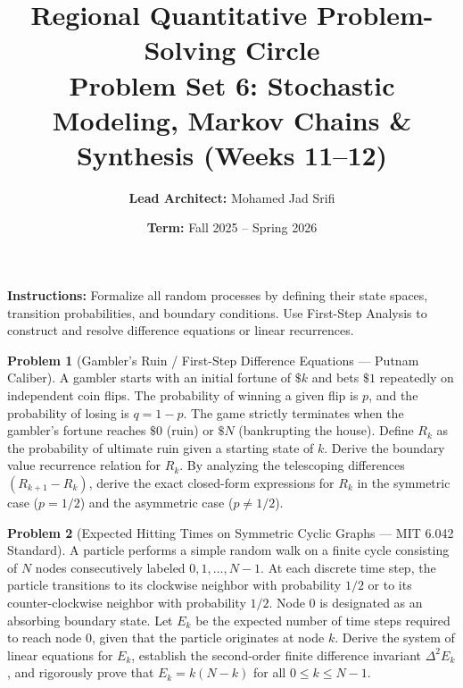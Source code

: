 \documentclass[11pt, a4paper]{article}
\theoremstyle{definition}
\newtheorem{problem}{Problem}
\theoremstyle{plain}
\begin{document}
\title{\vspace{-1.5cm}\textbf{Regional Quantitative Problem-Solving Circle} \\ \Large Problem Set 6: Stochastic Modeling, Markov Chains \& Synthesis (Weeks 11--12)}
\author{\textbf{Lead Architect:} Mohamed Jad Srifi}
\date{\textbf{Term:} Fall 2025 -- Spring 2026}
\maketitle

\noindent\textbf{Instructions:} Formalize all random processes by defining their state spaces, transition probabilities, and boundary conditions. Use First-Step Analysis to construct and resolve difference equations or linear recurrences.

\vspace{0.5cm}

\begin{problem}[Gambler's Ruin / First-Step Difference Equations --- Putnam Caliber]
A gambler starts with an initial fortune of $\$k$ and bets $\$1$ repeatedly on independent coin flips. The probability of winning a given flip is $p$, and the probability of losing is $q = 1 - p$. The game strictly terminates when the gambler's fortune reaches $\$0$ (ruin) or $\$N$ (bankrupting the house).
Define $R_k$ as the probability of ultimate ruin given a starting state of $k$.
Derive the boundary value recurrence relation for $R_k$. By analyzing the telescoping differences $(R_{k+1} - R_k)$, derive the exact closed-form expressions for $R_k$ in the symmetric case ($p = 1/2$) and the asymmetric case ($p \ne 1/2$).
\end{problem}

\vspace{0.5cm}

\begin{problem}[Expected Hitting Times on Symmetric Cyclic Graphs --- MIT 6.042 Standard]
A particle performs a simple random walk on a finite cycle consisting of $N$ nodes consecutively labeled $0, 1, \dots, N-1$. At each discrete time step, the particle transitions to its clockwise neighbor with probability $1/2$ or to its counter-clockwise neighbor with probability $1/2$. Node $0$ is designated as an absorbing boundary state.
Let $E_k$ be the expected number of time steps required to reach node $0$, given that the particle originates at node $k$.
Derive the system of linear equations for $E_k$, establish the second-order finite difference invariant $\Delta^2 E_k$, and rigorously prove that $E_k = k(N - k)$ for all $0 \le k \le N-1$.
\end{problem}
\end{document}
